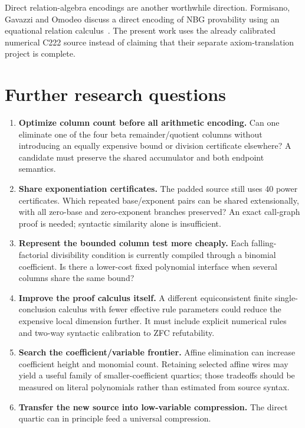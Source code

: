 \documentclass[11pt,a4paper]{article}
\theoremstyle{definition}\newtheorem{definition}[theorem]{Definition}
\theoremstyle{remark}\newtheorem{remark}[theorem]{Remark}
\numberwithin{equation}{section}
\begin{document}
Direct relation-algebra encodings are another worthwhile direction.
Formisano, Gavazzi and Omodeo discuss a direct encoding of NBG provability
using an equational relation calculus~\cite{fgo}. The present work uses
the already calibrated numerical C222 source instead of claiming that
their separate axiom-translation project is complete.

\section{Further research questions}

\begin{enumerate}
\item \textbf{Optimize column count before all arithmetic encoding.}
      Can one eliminate one of the four beta remainder/quotient
      columns without introducing an equally expensive bound or division
      certificate elsewhere? A candidate must preserve the shared
      accumulator and both endpoint semantics.
\item \textbf{Share exponentiation certificates.}
      The padded source still uses 40 power certificates. Which repeated
      base/exponent pairs can be shared extensionally, with all zero-base
      and zero-exponent branches preserved? An exact call-graph proof is
      needed; syntactic similarity alone is insufficient.
\item \textbf{Represent the bounded column test more cheaply.}
      Each falling-factorial divisibility condition is currently compiled
      through a binomial coefficient. Is there a lower-cost fixed
      polynomial interface when several columns share the same bound?
\item \textbf{Improve the proof calculus itself.}
      A different equiconsistent finite single-conclusion calculus with
      fewer effective rule parameters could reduce the expensive local
      dimension further. It must include explicit numerical rules and
      two-way syntactic calibration to ZFC refutability.
\item \textbf{Search the coefficient/variable frontier.}
      Affine elimination can increase coefficient height and monomial
      count. Retaining selected affine wires may yield a useful family of
      smaller-coefficient quartics; those tradeoffs should be measured on
      literal polynomials rather than estimated from source syntax.
\item \textbf{Transfer the new source into low-variable compression.}
      The direct quartic can in principle feed a universal compression.

\end{enumerate}
\end{document}
